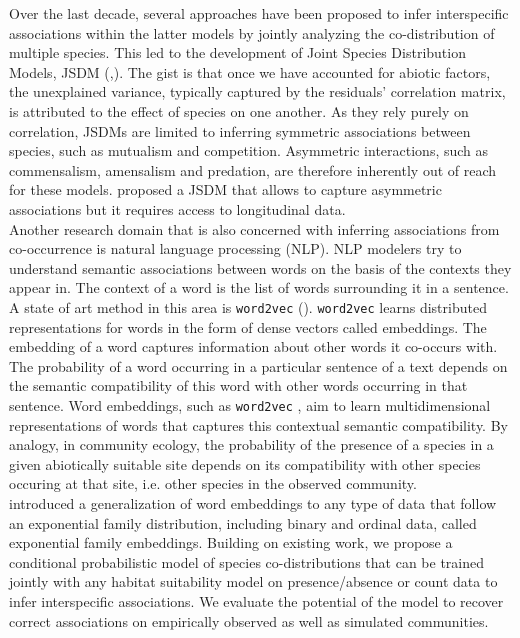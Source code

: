 \documentclass[10pt,a4paper]{article}
\begin{document}
Over the last decade, several approaches have been proposed to infer interspecific associations within the latter models by jointly analyzing the co-distribution of multiple species. This led to the development of Joint Species Distribution Models, JSDM (\cite{pollock2014understanding},\cite{ovaskainen2017make}). The gist is that once we have accounted for abiotic factors, the unexplained variance, typically captured by the residuals' correlation matrix, is attributed to the effect of species on one another. As they rely purely on correlation, JSDMs are limited to inferring symmetric associations between species, such as mutualism and competition. Asymmetric interactions, such as commensalism, amensalism and predation, are therefore inherently out of reach for these models. \cite{lany2018asymmetric} proposed a JSDM that allows to capture asymmetric associations but it requires access to longitudinal data. \\

Another research domain that is also concerned with inferring associations from co-occurrence is natural language processing (NLP). NLP modelers try to understand semantic associations between words on the basis of the contexts they appear in. The context of a word is the list of words surrounding it in a sentence. A state of art method in this area is \texttt{word2vec} (\cite{mikolov2013distributed}). \texttt{word2vec}  learns distributed representations for words in the form of dense vectors called embeddings. The embedding of a word captures information about other words it co-occurs with. The probability of a word occurring in a particular sentence of a text depends on the semantic compatibility of this word with other words occurring in that sentence. Word embeddings, such as \texttt{word2vec} , aim to learn multidimensional representations of words that captures this contextual semantic compatibility. By analogy, in community ecology, the probability of the presence of a species in a given abiotically suitable site depends on its compatibility with other species occuring at that site, i.e. other species in the observed community. \\

\cite{rudolph2016exponential, liu2017zero} introduced a generalization of word embeddings to any type of data that follow an exponential family distribution, including binary and ordinal data, called exponential family embeddings. Building on existing work, we propose a conditional probabilistic model of species co-distributions that can be trained jointly with any habitat suitability model on presence/absence or count data to infer interspecific associations. We evaluate the potential of the model to recover correct associations on empirically observed as well as simulated communities.
\end{document}
